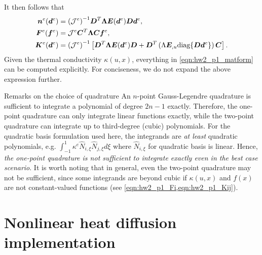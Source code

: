 It then follows that
\begin{equation}\label{eqn:hw2_p1_matform}
\begin{aligned}
    \bm{n}^e(\bm{d}^e) &= {(\mathcal{J}^e)}^{-1} \bm{D}^T \bm{\Lambda} \bm{E}(\bm{d}^e) \bm{D} \bm{d}^e, \\
    \bm{F}^e(\bm{f}^e) &= \mathcal{J}^e \bm{C}^T \bm{\Lambda} \bm{C} \bm{f}^e, \\
    \bm{K}^e(\bm{d}^e) &= {(\mathcal{J}^e)}^{-1} \left[ \bm{D}^T \bm{\Lambda} \bm{E}(\bm{d}^e) \bm{D} + \bm{D}^T \left( \Lambda \bm{E}_{,u} \textrm{diag}\{\bm{D} \bm{d}^e\} \right) \bm{C} \right].
\end{aligned}
\end{equation}
Given the thermal conductivity $\kappa(u, x)$, everything in \cref{eqn:hw2_p1_matform} can be computed explicitly.  
For conciseness, we do not expand the above expression further. 

\begin{codenv}{Remarks on the choice of quadrature}
    An $n$-point Gauss-Legendre quadrature is sufficient to integrate a polynomial of degree $2n - 1$ exactly. 
    Therefore, the one-point quadrature can only integrate linear functions exactly, while the two-point quadrature can integrate up to third-degree (cubic) polynomials.
    For the quadratic basis formulation used here, the integrands are \emph{at least} quadratic polynomials, e.g. $\int_{-1}^{1} \kappa^e \hat{N}_{i,\xi} \hat{N}_{j,\xi} d\xi$ where $\hat{N}_{i,\xi}$ for quadratic basis is linear. 
    Hence, \emph{the one-point quadrature is not sufficient to integrate exactly even in the best case scenario}. 
    It is worth noting that in general, even the two-point quadrature may not be sufficient, since some integrands are beyond cubic if $\kappa(u, x)$ and $f(x)$ are not constant-valued functions (see \cref{eqn:hw2_p1_Fi,eqn:hw2_p1_Kij}). 
\end{codenv}

\section{Nonlinear heat diffusion implementation}
